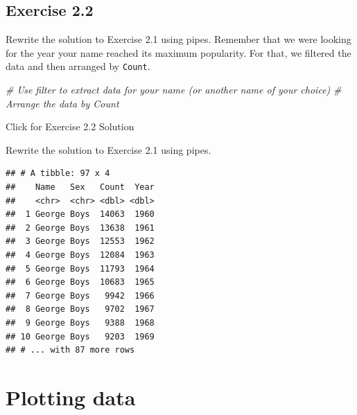 \documentclass[]{book}
\newenvironment{Shaded}{\begin{snugshade}}{\end{snugshade}}
\newcommand{\CommentTok}[1]{\textcolor[rgb]{0.56,0.35,0.01}{\textit{#1}}}
\newcommand{\KeywordTok}[1]{\textcolor[rgb]{0.13,0.29,0.53}{\textbf{#1}}}
\newcommand{\NormalTok}[1]{#1}
\newcommand{\OperatorTok}[1]{\textcolor[rgb]{0.81,0.36,0.00}{\textbf{#1}}}
\newcommand{\StringTok}[1]{\textcolor[rgb]{0.31,0.60,0.02}{#1}}
\begin{document}
\hypertarget{exercise-2.2}{%
\subsection{Exercise 2.2}\label{exercise-2.2}}

Rewrite the solution to Exercise 2.1 using pipes. Remember that we were looking
for the year your name reached its maximum popularity. For that, we filtered
the data and then arranged by \texttt{Count}.

\begin{Shaded}
\begin{Highlighting}[]
\CommentTok{# Use filter to extract data for your name (or another name of your choice)}
\CommentTok{# Arrange the data by Count}
\end{Highlighting}
\end{Shaded}

{Click for Exercise 2.2 Solution}

Rewrite the solution to Exercise 2.1 using pipes.

\begin{Shaded}
\end{Shaded}

\begin{verbatim}
## # A tibble: 97 x 4
##    Name   Sex   Count  Year
##    <chr>  <chr> <dbl> <dbl>
##  1 George Boys  14063  1960
##  2 George Boys  13638  1961
##  3 George Boys  12553  1962
##  4 George Boys  12084  1963
##  5 George Boys  11793  1964
##  6 George Boys  10683  1965
##  7 George Boys   9942  1966
##  8 George Boys   9702  1967
##  9 George Boys   9388  1968
## 10 George Boys   9203  1969
## # ... with 87 more rows
\end{verbatim}

\hypertarget{plotting-data}{%
\section{Plotting data}\label{plotting-data}}
\end{document}
